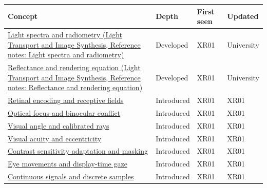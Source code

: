 {\def\LTcaptype{none} %
\begin{longtable}[]{@{}
  >{\raggedright\arraybackslash}p{}
  >{\raggedright\arraybackslash}p{}
  >{\raggedright\arraybackslash}p{}
  >{\raggedright\arraybackslash}p{}@{}}
\toprule\noalign{}
\begin{minipage}[b]{\linewidth}\raggedright
Concept
\end{minipage} & \begin{minipage}[b]{\linewidth}\raggedright
Depth
\end{minipage} & \begin{minipage}[b]{\linewidth}\raggedright
First seen
\end{minipage} & \begin{minipage}[b]{\linewidth}\raggedright
Updated
\end{minipage} \\
\midrule\noalign{}
\endhead
\bottomrule\noalign{}
\endlastfoot
\href{../04-Light-Transport-and-Image-Synthesis/main.pdf\#nameddest=appendix-215c2570199b}{Light spectra and radiometry (Light Transport and Image Synthesis, Reference notes: Light spectra and radiometry)} & Developed & XR01 & University \\
\href{../04-Light-Transport-and-Image-Synthesis/main.pdf\#nameddest=appendix-96da0b153b77}{Reflectance and rendering equation (Light Transport and Image Synthesis, Reference notes: Reflectance and rendering equation)} & Developed & XR01 & University \\
\hyperref[appendix-7281c15ac44a]{Retinal encoding and receptive fields} & Introduced & XR01 & XR01 \\
\hyperref[appendix-f90cee1be7a4]{Optical focus and binocular conflict} & Introduced & XR01 & XR01 \\
\hyperref[appendix-7d356c396d1a]{Visual angle and calibrated rays} & Introduced & XR01 & XR01 \\
\hyperref[appendix-b491fc48c54b]{Visual acuity and eccentricity} & Introduced & XR01 & XR01 \\
\hyperref[appendix-b3aa9e8e01ad]{Contrast sensitivity adaptation and masking} & Introduced & XR01 & XR01 \\
\hyperref[appendix-a6f2c4fe1996]{Eye movements and display-time gaze} & Introduced & XR01 & XR01 \\
\hyperref[appendix-1077ea8fc737]{Continuous signals and discrete samples} & Introduced & XR01 & XR01 \\

\end{longtable}}

